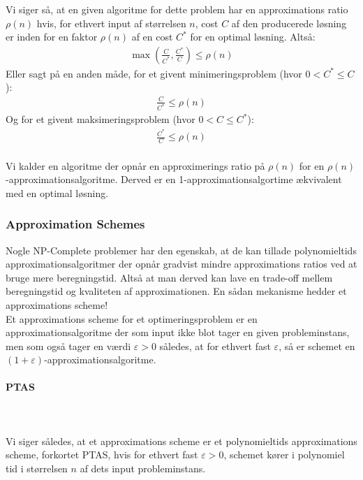 Vi siger så, at en given algoritme for dette problem har en approximations ratio $\rho(n)$ hvis, for ethvert input af størrelsen $n$, cost $C$ af den producerede løsning er inden for en faktor $\rho(n)$ af en cost $C^*$ for en optimal løsning. Altså:
\begin{align*}
 \max(\frac{C}{C^*},\frac{C^*}{C}) \leq \rho(n)
\end{align*}
Eller sagt på en anden måde, for et givent minimeringsproblem (hvor $0 < C^* \leq C$):
\begin{align*}
 \frac{C}{C^*} \leq \rho(n)
\end{align*}
Og for et givent maksimeringsproblem (hvor $0 < C \leq C^*$):
\begin{align*}
 \frac{C^*}{C} \leq \rho(n)
\end{align*}
~\\
Vi kalder en algoritme der opnår en approximerings ratio på $\rho(n)$ for en $\rho(n)$-approximationsalgoritme. Derved er en 1-approximationsalgortime ækvivalent med en optimal løsning.

\subsubsection{Approximation Schemes}

Nogle NP-Complete problemer har den egenskab, at de kan tillade polynomieltids approximationsalgoritmer der opnår gradvist mindre approximations ratios ved at bruge mere beregningstid. Altså at man derved kan lave en trade-off mellem beregningstid og kvaliteten af approximationen. En sådan mekanisme hedder et approximations scheme!\\

Et approximations scheme for et optimeringsproblem er en approximationsalgoritme der som input ikke blot tager en given probleminstans, men som også tager en værdi $\varepsilon > 0$ således, at for ethvert fast $\varepsilon$, så er schemet en $(1+\varepsilon)$-approximationsalgoritme.

\paragraph{PTAS}
~\\
~\\

Vi siger således, at et approximations scheme er et polynomieltids approximations scheme, forkortet PTAS, hvis for ethvert fast $\varepsilon > 0$, schemet kører i polynomiel tid i størrelsen $n$ af dets input probleminstans.

